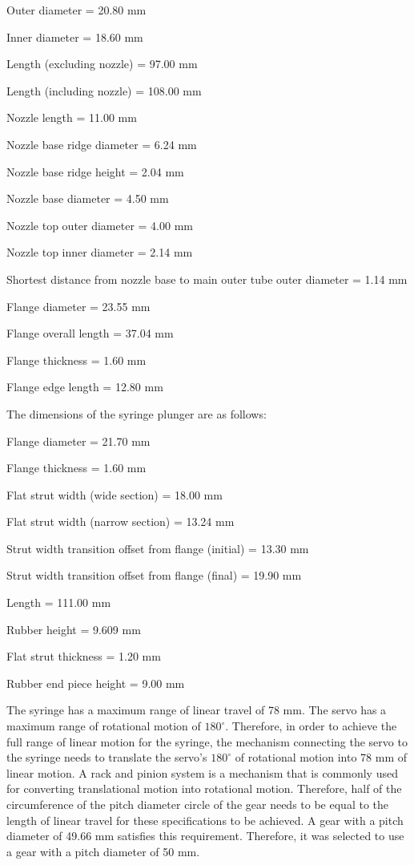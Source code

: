 \begin{compactitem}
	\item Outer diameter = 20.80 mm
	\item Inner diameter = 18.60 mm
	\item Length (excluding nozzle) = 97.00 mm
	\item Length (including nozzle) = 108.00 mm
	\item Nozzle length = 11.00 mm
	\item Nozzle base ridge diameter = 6.24 mm
	\item Nozzle base ridge height = 2.04 mm
	\item Nozzle base diameter = 4.50 mm
	\item Nozzle top outer diameter = 4.00 mm
	\item Nozzle top inner diameter = 2.14 mm
	\item Shortest distance from nozzle base to main outer tube outer diameter = 1.14 mm
	\item Flange diameter = 23.55 mm
	\item Flange overall length = 37.04 mm
	\item Flange thickness = 1.60 mm
	\item Flange edge length = 12.80 mm
\end{compactitem}

The dimensions of the syringe plunger are as follows:

\begin{compactitem}
	\item Flange diameter = 21.70 mm
	\item Flange thickness = 1.60 mm
	\item Flat strut width (wide section) = 18.00 mm
	\item Flat strut width (narrow section) = 13.24 mm
	\item Strut width transition offset from flange (initial) = 13.30 mm
	\item Strut width transition offset from flange (final) = 19.90 mm
	\item Length = 111.00 mm
	\item Rubber height = 9.609 mm 
	\item Flat strut thickness = 1.20 mm
	\item Rubber end piece height = 9.00 mm
\end{compactitem}

The syringe has a maximum range of linear travel of 78 mm. The servo has a maximum range of rotational motion of $180^{\circ}$. Therefore, in order to achieve the full range of linear motion for the syringe, the mechanism connecting the servo to the syringe needs to translate the servo's $180^{\circ}$ of rotational motion into 78 mm of linear motion. A rack and pinion system is a mechanism that is commonly used for converting translational motion into rotational motion. Therefore, half of the circumference of the pitch diameter circle of the gear needs to be equal to the length of linear travel for these specifications to be achieved. A gear with a pitch diameter of 49.66 mm satisfies this requirement. Therefore, it was selected to use a gear with a pitch diameter of 50 mm.

